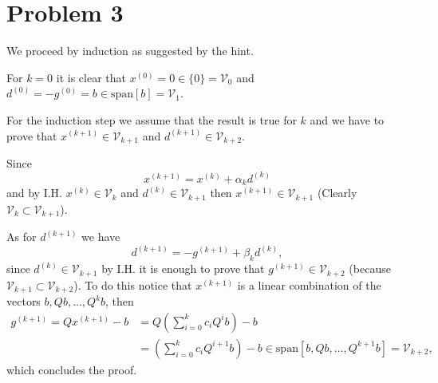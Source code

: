 \documentclass{article}
\begin{document}
\section*{Problem 3}
We proceed by induction as suggested by the hint.

For $k=0$ it is clear that $x^{(0)}=0\in\{0\}=\mathcal{V}_0$ and
$d^{(0)}=-g^{(0)}=b\in \text{span}[b]=\mathcal{V}_1$.

For the induction step we assume that the result is true for $k$ and we have to
prove that $x^{(k+1)}\in \mathcal{V}_{k+1}$ and $d^{(k+1)}\in
\mathcal{V}_{k+2}$.

Since
\[
x^{(k+1)}=x^{(k)}+\alpha_kd^{(k)}
\]
and by I.H. $x^{(k)}\in \mathcal{V}_k$ and $d^{(k)}\in\mathcal{V}_{k+1}$ then
$x^{(k+1)}\in
\mathcal{V}_{k+1}$ (Clearly $\mathcal{V}_k\subset\mathcal{V}_{k+1}$).

As for $d^{(k+1)}$ we have
\[
d^{(k+1)}=-g^{(k+1)}+\beta_k d^{(k)},
\]
since $d^{(k)}\in\mathcal{V}_{k+1}$ by I.H. it is enough to prove that
$g^{(k+1)}\in\mathcal{V}_{k+2}$ (because
$\mathcal{V}_{k+1}\subset\mathcal{V}_{k+2}$). To do this notice that
$x^{(k+1)}$ is a linear combination of the vectors $b,Qb,\dots,Q^{k}b$, then
\begin{align*}
g^{(k+1)}=Qx^{(k+1)}-b&=Q\left(\sum_{i=0}^kc_iQ^ib\right) -b\\
&=\left(\sum_{i=0}^kc_iQ^{i+1}b\right)-b \in
\text{span}[b,Qb,\dots,Q^{k+1}b]=\mathcal{V}_{k+2},
\end{align*}
which concludes the proof.
\end{document}
